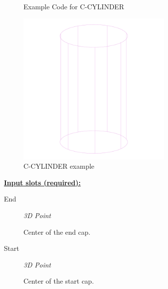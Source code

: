 \documentclass [11pt]{book}
\begin{document}
\begin{itemize}
\begin{figure}
\begin{lrbox}{\boxedverb}
\begin{minipage}{\linewidth}
{\begin{verbatim}
\end{verbatim}}
\end{minipage}
\end{lrbox}
\fbox{\usebox{\boxedverb}}

\caption{Example Code for C-CYLINDER}

\label{fig:example-code-C-CYLINDER}

\end{figure}

\begin{figure}
\begin{center}
\includegraphics[width=3in,height=3in]{../images/example-c-cylinder.pdf}
\end{center}

\caption{C-CYLINDER example}

\label{fig:C-CYLINDER}

\end{figure}





\textbf{
\underline{Input slots (required):}}

\begin{description}

\item [End]
\emph{3D Point}

 Center of the end cap.




\item [Start]
\emph{3D Point}

 Center of the start cap.




\end{description}







\end{itemize}
\end{document}
